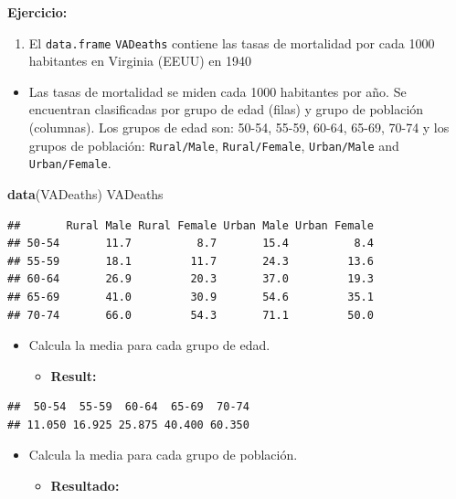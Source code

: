 \documentclass[]{article}
\def\tightlist{}
\newenvironment{Shaded}{\begin{snugshade}}{\end{snugshade}}
\newcommand{\KeywordTok}[1]{\textcolor[rgb]{0.13,0.29,0.53}{\textbf{{#1}}}}
\newcommand{\NormalTok}[1]{{#1}}
\numberwithin{equation}{section}
\begin{document}
\textbf{Ejercicio:}

\begin{enumerate}
\def\labelenumi{\arabic{enumi}.}
\tightlist
\item
  El \texttt{data.frame} \texttt{VADeaths} contiene las tasas de
  mortalidad por cada 1000 habitantes en Virginia (EEUU) en 1940
\end{enumerate}

\begin{itemize}
\tightlist
\item
  Las tasas de mortalidad se miden cada 1000 habitantes por año. Se
  encuentran clasificadas por grupo de edad (filas) y grupo de población
  (columnas). Los grupos de edad son: 50-54, 55-59, 60-64, 65-69, 70-74
  y los grupos de población: \texttt{Rural/Male}, \texttt{Rural/Female},
  \texttt{Urban/Male} and \texttt{Urban/Female}.
\end{itemize}

\begin{Shaded}
\begin{Highlighting}[]
\KeywordTok{data}\NormalTok{(VADeaths)}
\NormalTok{VADeaths}
\end{Highlighting}
\end{Shaded}

\begin{verbatim}
##       Rural Male Rural Female Urban Male Urban Female
## 50-54       11.7          8.7       15.4          8.4
## 55-59       18.1         11.7       24.3         13.6
## 60-64       26.9         20.3       37.0         19.3
## 65-69       41.0         30.9       54.6         35.1
## 70-74       66.0         54.3       71.1         50.0
\end{verbatim}

\begin{itemize}
\item
  Calcula la media para cada grupo de edad.

  \begin{itemize}
  \tightlist
  \item
    \textbf{Result:}
  \end{itemize}
\end{itemize}

\begin{verbatim}
##  50-54  55-59  60-64  65-69  70-74 
## 11.050 16.925 25.875 40.400 60.350
\end{verbatim}

\begin{itemize}
\item
  Calcula la media para cada grupo de población.

  \begin{itemize}
  \tightlist
  \item
    \textbf{Resultado:}
  \end{itemize}
\end{itemize}
\end{document}
